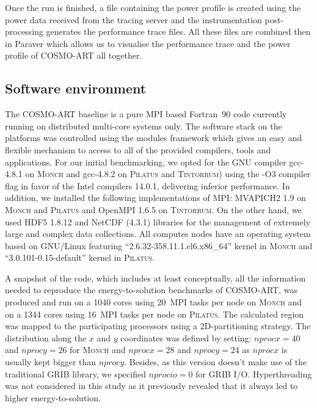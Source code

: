 Once  the run  is finished,  a file  containing the  power  profile is
created using the power data  received from the tracing server and the
instrumentation post-processing generates the performance trace files.
All  these files  are  combined then  in  Paraver which  allows us  to
visualise   the   performance  trace   and   the   power  profile   of
\textsc{COSMO-ART} all together.

\subsection{Software environment}
\label{subsec:3.2}

The \textsc{COSMO-ART}  baseline is a  pure MPI based  Fortran~90 code
currently  running  on   distributed  multi-core  systems  only.   The
software stack on the platforms was controlled using the modules
framework which gives an easy  and flexible mechanism to access to all
of the  provided compilers, tools  and applications.  For  our initial
benchmarking,   we  opted   for   the  GNU   compiler  gcc-4.8.1   on
\textsc{Monch} and gcc-4.8.2 on  \textsc{Pilatus} and \textsc{Tintorrum}) using the -O3 compiler
flag  in favor  of the  Intel compilers 14.0.1,  delivering inferior
performance.  In  addition, we installed the following implementations of MPI: MVAPICH2 1.9 on \textsc{Monch} and \textsc{Pilatus} and  OpenMPI 1.6.5 on \textsc{Tintorrum}. On the other hand, we  used HDF5 1.8.12 and NetCDF  (4.3.1) libraries for  the management  of extremely  large and
complex data collections.  All computes nodes have an operating system
based on GNU/Linux featuring ``2.6.32-358.11.1.el6.x86\_64'' kernel in
\textsc{Monch}     and      ``3.0.101-0.15-default''     kernel     in
\textsc{Pilatus}.

A snapshot of the code,  which includes at least conceptually, all the
information needed  to reproduce the  energy-to-solution benchmarks of
\textsc{COSMO-ART}, was produced and run  on a 1040 cores using 20~MPI
tasks  per node on  \textsc{Monch} and  on a  1344 cores  using 16~MPI
tasks per node on  \textsc{Pilatus}.  The calculated region was mapped
to the participating processors using a 2D-partitioning strategy.  The
distribution along the $x$ and $y$ coordinates was defined by setting:
$nprocx=40$  and $nprocy=26$  for \textsc{Monch}  and  $nprocx=28$ and
$nprocy=24$  as  $nprocx$  is   usually  kept  bigger  than  $nprocy$.
Besides,  as this  version doesn't  make use  of the  traditional GRIB
library, we  specified $nprocio=0$  for GRIB I/O.   Hyperthreading was
not considered in this study  as it previously revealed that it always
led to higher energy-to-solution.



